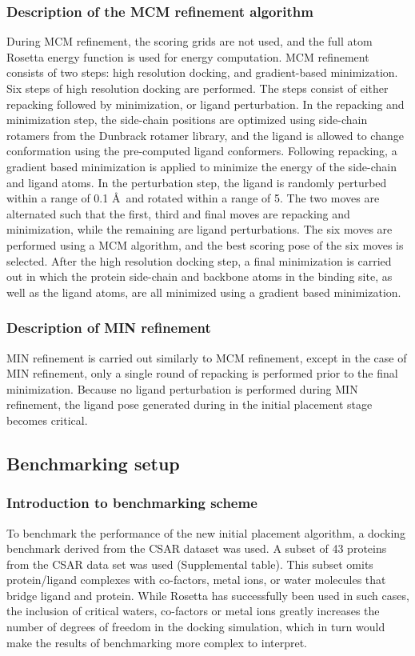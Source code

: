 \subsubsection{Description of the MCM refinement algorithm}
During MCM refinement, the scoring grids are not used, and the full atom Rosetta energy function is used for energy computation.
MCM refinement consists of two steps: high resolution docking, and gradient-based minimization.
Six steps of high resolution docking are performed. The steps consist of either repacking followed by minimization, or ligand perturbation.
In the repacking and minimization step, the side-chain positions are optimized using side-chain rotamers from the Dunbrack rotamer library\citep{Shapovalov:2011bw}, and the ligand is allowed to change conformation using the pre-computed ligand conformers.
Following repacking, a gradient based minimization is applied to minimize the energy of the side-chain and ligand atoms.
In the perturbation step, the ligand is randomly perturbed within a range of 0.1 \AA\ and rotated within a range of 5\textdegree.
The two moves are alternated such that the first, third and final moves are repacking and minimization, while the remaining are ligand perturbations. The six moves are performed using a MCM algorithm, and the best scoring pose of the six moves is selected.
After the high resolution docking step, a final minimization is carried out in which the protein side-chain and backbone atoms in the binding site, as well as the ligand atoms, are all minimized using a gradient based minimization.

\subsubsection{Description of MIN refinement}
MIN refinement is carried out similarly to MCM refinement, except in the case of MIN refinement, only a single round of repacking is performed prior to the final minimization.
Because no ligand perturbation is performed during MIN refinement, the ligand pose generated during in the initial placement stage becomes critical.

\subsection{Benchmarking setup}
\subsubsection{Introduction to benchmarking scheme}
To benchmark the performance of the new initial placement algorithm, a docking benchmark derived from the CSAR\citep{DunbarJr:2011kq} dataset was used.
A subset of 43 proteins from the CSAR data set was used (Supplemental table). %
This subset omits protein/ligand complexes with co-factors, metal ions, or water molecules that bridge ligand and protein.
While Rosetta has successfully been used in such cases\citep{Lemmon:2013jd},  the inclusion of critical waters, co-factors or metal ions greatly increases the number of degrees of freedom in the docking simulation, which in turn would make the results of benchmarking more complex to interpret.
 
